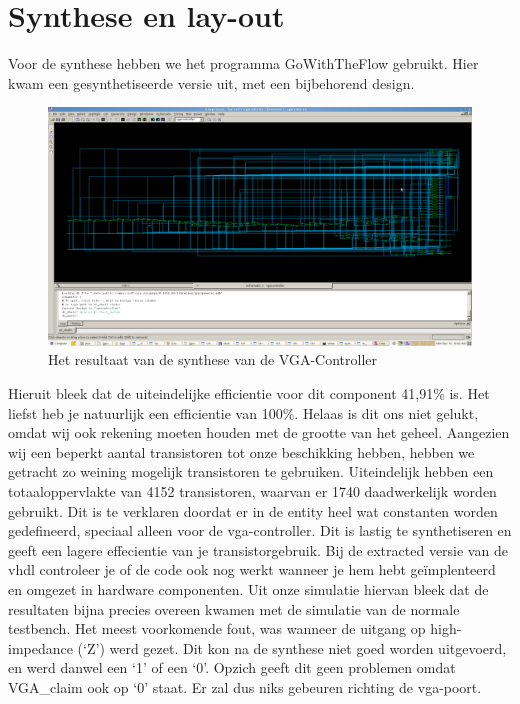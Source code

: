 \documentclass{scrartcl}  %
\begin{document}
\section{Synthese en lay-out}
Voor de synthese hebben we het programma GoWithTheFlow gebruikt. Hier kwam een gesynthetiseerde versie uit, met een bijbehorend design.
\begin{figure}[H]
\centering
		\includegraphics[width=1\textwidth]{resource/circuitvgafinal.png}
		
		\caption{Het resultaat van de synthese van de VGA-Controller}
		\label{fig:circuit}
\end{figure}
Hieruit bleek dat de uiteindelijke efficientie voor dit component 41,91\% is. Het liefst heb je natuurlijk een efficientie van 100\%. Helaas is dit ons niet gelukt, omdat wij ook rekening moeten houden met de grootte van het geheel. Aangezien wij een beperkt aantal transistoren tot onze beschikking hebben, hebben we getracht zo weining mogelijk transistoren te gebruiken. Uiteindelijk hebben een totaaloppervlakte van  4152 transistoren, waarvan er 1740 daadwerkelijk worden gebruikt. Dit is te verklaren doordat er in de entity heel wat constanten worden gedefineerd, speciaal alleen voor de vga-controller. Dit is lastig te synthetiseren en geeft een lagere effecientie van je transistorgebruik.
Bij de extracted versie van de vhdl controleer je of de code ook nog werkt wanneer je hem hebt geïmplenteerd en omgezet in hardware componenten. Uit onze simulatie hiervan bleek dat de resultaten bijna precies overeen kwamen met de simulatie van de normale testbench. Het meest voorkomende fout, was wanneer de uitgang op high-impedance (`Z') werd gezet. Dit kon na de synthese niet goed worden uitgevoerd, en werd danwel een `1' of een `0'. Opzich geeft dit geen problemen omdat VGA\_claim ook op `0' staat. Er zal dus niks gebeuren richting de vga-poort.
\end{document}
